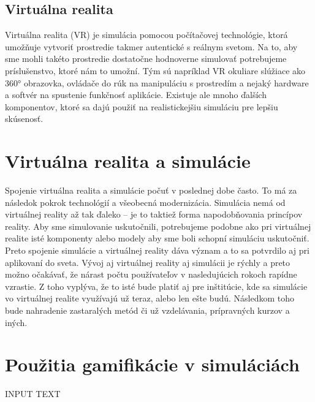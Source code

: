 \documentclass[10pt,slovak,a4paper]{article}
\begin{document}
\subsection{Virtuálna realita} \label{Gamification:virtual_reality}

Virtuálna realita (VR) je simulácia pomocou počítačovej technológie, ktorá umožňuje vytvoriť prostredie takmer autentické s reálnym svetom. Na to, aby sme mohli takéto prostredie dostatočne hodnoverne simulovať potrebujeme príslušenstvo, ktoré nám to umožní. Tým sú napríklad VR okuliare slúžiace ako 360° obrazovka, ovládače do rúk na manipuláciu s prostredím a nejaký hardware a softvér na spustenie funkčnosť aplikácie. Existuje ale mnoho ďalších komponentov, ktoré sa dajú použiť na realistickejšiu simuláciu pre lepšiu skúsenosť. 


\section{Virtuálna realita a simulácie} \label{Simulations}

Spojenie virtuálna realita a simulácie počuť v poslednej dobe často. To má za následok pokrok technológií a všeobecná modernizácia. Simulácia nemá od virtuálnej reality až tak ďaleko – je to taktiež forma napodobňovania princípov reality. Aby sme simulovanie uskutočnili, potrebujeme podobne ako pri virtuálnej realite isté komponenty alebo modely aby sme boli schopní simuláciu uskutočniť. Preto spojenie simulácie a virtuálnej reality dáva význam a to sa potvrdilo aj pri aplikovaní do sveta. Vývoj aj virtuálnej reality aj simulácii je rýchly a preto možno očakávať, že nárast počtu používateľov v nasledujúcich rokoch rapídne vzrastie. Z toho vyplýva, že to isté bude platiť aj pre inštitúcie, kde sa simulácie vo virtuálnej realite využívajú už teraz, alebo len ešte budú. Následkom toho bude nahradenie zastaralých metód či už vzdelávania, prípravných kurzov a iných. 


\section{Použitia gamifikácie v simuláciách} \label{Uses}

INPUT TEXT
\end{document}
